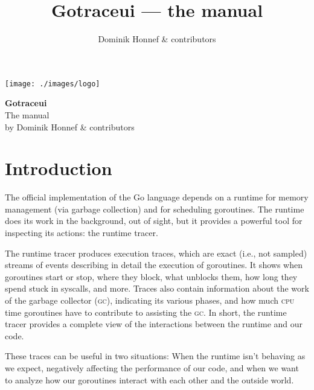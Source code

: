 \documentclass[10pt,letterpaper,oneside,openany,english]{memoir}
\title{Gotraceui --- the manual}
\author{Dominik Honnef \& contributors}
\begin{document}
\frontmatter

\begin{titlingpage}
\centering
\texttt{[image: ./images/logo]}

\begin{vplace}
{\HUGE\bfseries Gotraceui}\\[\baselineskip]
{\Huge The manual}\\[2\baselineskip]
{by Dominik Honnef \& contributors}\\
\end{vplace}
\end{titlingpage}

\enlargethispage{2\baselineskip}
\tableofcontents
{}

\mainmatter


\chapter{Introduction}

The official implementation of the Go language depends on a runtime for memory management (via garbage collection) and for scheduling goroutines.
The runtime does its work in the background, out of sight, but it provides a powerful tool for inspecting its actions: the runtime tracer.

The runtime tracer produces execution traces, which are exact (i.e., not sampled) streams of events describing in detail the execution of goroutines.
It shows when goroutines start or stop, where they block, what unblocks them, how long they spend stuck in syscalls, and more.
Traces also contain information about the work of the garbage collector (\textsc{gc}), indicating its various phases, and how much \textsc{cpu} time goroutines have to contribute to assisting the \textsc{gc}.
In short, the runtime tracer provides a complete view of the interactions between the runtime and our code.

These traces can be useful in two situations:
When the runtime isn't behaving as we expect, negatively affecting the performance of our code,
and when we want to analyze how our goroutines interact with each other and the outside world.
\end{document}
